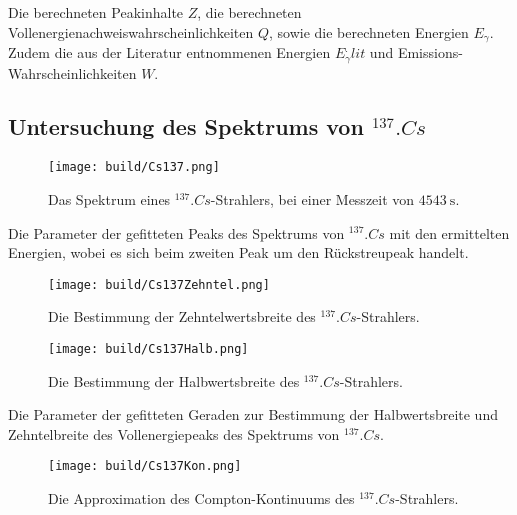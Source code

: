 \begin{table}
	\centering
	\caption{Die berechneten Peakinhalte $Z$, die berechneten Vollenergienachweiswahrscheinlichkeiten $Q$, sowie die berechneten Energien $E_\gamma$. Zudem die aus der Literatur entnommenen Energien $E_\gamma^.{lit}$ und Emissions-Wahrscheinlichkeiten $W$.}
	
	\label{tab:Q}
\end{table}

\subsection{Untersuchung des Spektrums von $^{137}.{Cs}$}

\begin{figure}
	\centering
	\texttt{[image: build/Cs137.png]}
	\caption{Das Spektrum eines $^{137}.{Cs}$-Strahlers, bei einer Messzeit von $\SI{4543}{\second}$.}
	\label{fig:SpektrumCs}
\end{figure}

\begin{table}
	\centering
	\caption{Die Parameter der gefitteten Peaks des Spektrums von $^{137}.{Cs}$ mit den ermittelten Energien, wobei es sich beim zweiten Peak um den Rückstreupeak handelt.}
	
	\label{tab:parameterCs}
\end{table}

\begin{figure}
	\centering
	\texttt{[image: build/Cs137Zehntel.png]}
	\caption{Die Bestimmung der Zehntelwertsbreite des $^{137}.{Cs}$-Strahlers.}
	\label{fig:10tel}
\end{figure}

\begin{figure}
	\centering
	\texttt{[image: build/Cs137Halb.png]}
	\caption{Die Bestimmung der Halbwertsbreite des $^{137}.{Cs}$-Strahlers.}
	\label{fig:2tel}
\end{figure}

\begin{table}
	\centering
	\caption{Die Parameter der gefitteten Geraden zur Bestimmung der Halbwertsbreite und Zehntelbreite des Vollenergiepeaks des Spektrums von $^{137}.{Cs}$.}
	
\end{table}

\begin{figure}
	\centering
	\texttt{[image: build/Cs137Kon.png]}
	\caption{Die Approximation des Compton-Kontinuums des $^{137}.{Cs}$-Strahlers.}
	\label{fig:Comptonkontinuum}
\end{figure}

